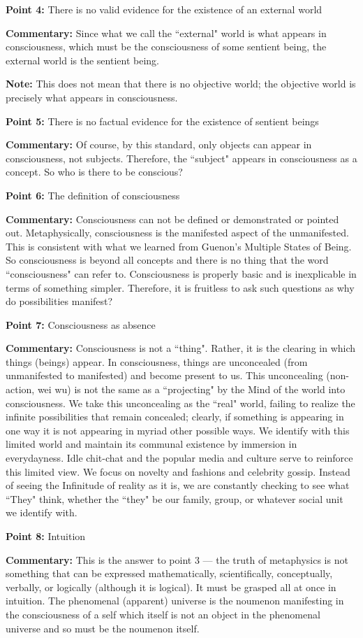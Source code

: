 \textbf{Point 4:} There is no valid evidence for the existence of an external world

\textbf{Commentary:} Since what we call the ``external" world is what appears in consciousness, which must be the consciousness of some sentient being, the external world is the sentient being.

\textbf{Note:} This does not mean that there is no objective world; the objective world is precisely what appears in consciousness.

\textbf{Point 5:} There is no factual evidence for the existence of sentient beings

\textbf{Commentary:} Of course, by this standard, only objects can appear in consciousness, not subjects. Therefore, the ``subject" appears in consciousness as a concept. So who is there to be conscious?

\textbf{Point 6:} The definition of consciousness

\textbf{Commentary:} Consciousness can not be defined or demonstrated or pointed out. Metaphysically, consciousness is the manifested aspect of the unmanifested. This is consistent with what we learned from Guenon's Multiple States of Being. So consciousness is beyond all concepts and there is no thing that the word ``consciousness" can refer to. Consciousness is properly basic and is inexplicable in terms of something simpler. Therefore, it is fruitless to ask such questions as why do possibilities manifest?

\textbf{Point 7:} Consciousness as absence

\textbf{Commentary:} Consciousness is not a ``thing". Rather, it is the clearing in which things (beings) appear. In consciousness, things are unconcealed (from unmanifested to manifested) and become present to us. This unconcealing (non-action, wei wu) is not the same as a ``projecting" by the Mind of the world into consciousness. We take this unconcealing as the ``real" world, failing to realize the infinite possibilities that remain concealed; clearly, if something is appearing in one way it is not appearing in myriad other possible ways. We identify with this limited world and maintain its communal existence by immersion in everydayness. Idle chit-chat and the popular media and culture serve to reinforce this limited view. We focus on novelty and fashions and celebrity gossip. Instead of seeing the Infinitude of reality as it is, we are constantly checking to see what ``They" think, whether the ``they" be our family, group, or whatever social unit we identify with.

\textbf{Point 8:} Intuition

\textbf{Commentary:} This is the answer to point 3 — the truth of metaphysics is not something that can be expressed mathematically, scientifically, conceptually, verbally, or logically (although it is logical). It must be grasped all at once in intuition. The phenomenal (apparent) universe is the noumenon manifesting in the consciousness of a self which itself is not an object in the phenomenal universe and so must be the noumenon itself.



